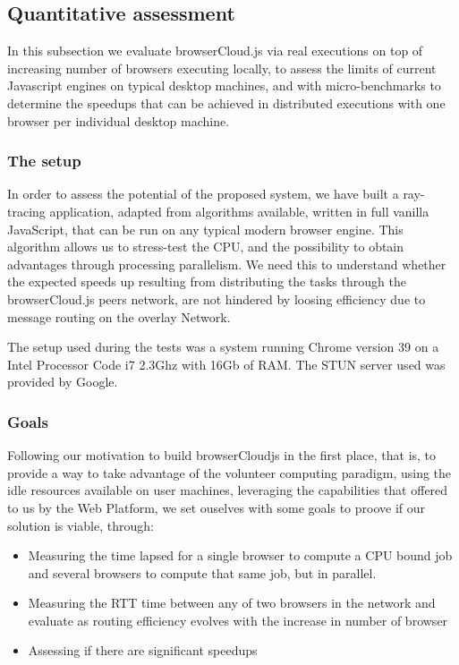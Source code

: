 \subsection{Quantitative assessment}

In this subsection we evaluate browserCloud.js via real executions on top of increasing number of browsers executing locally, to assess the limits of current Javascript engines on typical desktop machines, and with micro-benchmarks to determine the speedups that can be achieved in distributed executions with one browser per individual desktop machine.

\subsubsection{The setup}

In order to assess the potential of the proposed system, we have built a ray-tracing application, adapted from algorithms available, written in full vanilla JavaScript, that can be run on any typical modern browser engine. This algorithm allows us to stress-test the CPU,  and the possibility to obtain advantages through processing parallelism. We need this to understand whether the expected speeds up resulting from distributing the tasks through the browserCloud.js peers network, are not hindered by loosing efficiency due to message routing on the overlay Network.

The setup used during the tests was a system running Chrome version 39 on a Intel Processor Code i7 2.3Ghz with 16Gb of RAM. The STUN server used was provided by Google.

\subsubsection{Goals}

Following our motivation to build browserCloudjs in the first place, that is, to provide a way to take advantage of the volunteer computing paradigm, using the idle resources available on user machines, leveraging the capabilities that offered to us by the Web Platform, we set ouselves with some goals to proove if our solution is viable, through:

\begin{itemize}
    \item Measuring the time lapsed for a single browser to compute a CPU bound job and several browsers to compute that same job, but in parallel.
    \item Measuring the RTT time between any of two browsers in the network and evaluate as routing efficiency evolves with the increase in number of browser
    \item Assessing if there are significant speedups
\end{itemize}

